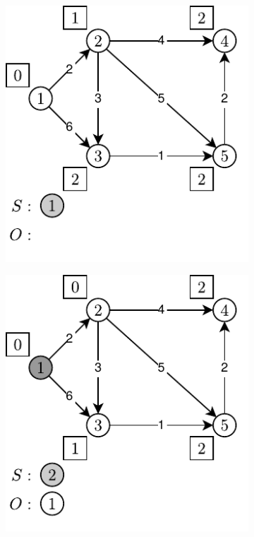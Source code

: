 \begin{figure}[!htbp]
	\centering
	\begin{subfigure}[b]{0.25\textwidth}
		\includegraphics[width=\textwidth]{Chapter_II/KHAN-TOPOLOGICAL-SORT-Example/a.pdf}
		\caption{}
	\end{subfigure}%
	\qquad
	\begin{subfigure}[b]{0.25\textwidth}
		\includegraphics[width=\textwidth]{Chapter_II/KHAN-TOPOLOGICAL-SORT-Example/b.pdf}

\end{subfigure}
\end{figure}
